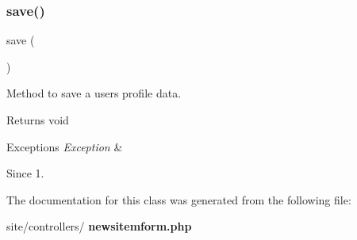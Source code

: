 \subsubsection{save()}
{\footnotesize\ttfamily save (\begin{DoxyParamCaption}{ }\end{DoxyParamCaption})}

Method to save a user\textquotesingle{}s profile data.

\begin{DoxyReturn}{Returns}
void
\end{DoxyReturn}

\begin{DoxyExceptions}{Exceptions}
{\em Exception} & \\
\hline
\end{DoxyExceptions}
\begin{DoxySince}{Since}
1. 
\end{DoxySince}


The documentation for this class was generated from the following file\+:\begin{DoxyCompactItemize}
\item 
site/controllers/\textbf{ newsitemform.\+php}\end{DoxyCompactItemize}
